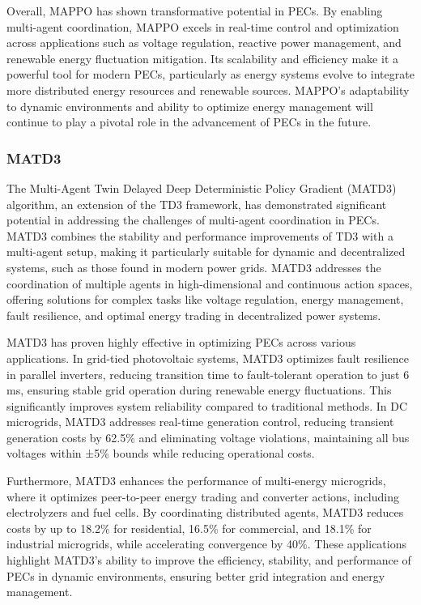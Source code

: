 Overall, MAPPO has shown transformative potential in PECs. By enabling multi-agent coordination, MAPPO excels in real-time control and optimization across applications such as voltage regulation, reactive power management, and renewable energy fluctuation mitigation. Its scalability and efficiency make it a powerful tool for modern PECs, particularly as energy systems evolve to integrate more distributed energy resources and renewable sources. MAPPO's adaptability to dynamic environments and ability to optimize energy management will continue to play a pivotal role in the advancement of PECs in the future.

\subsubsection{MATD3}

The Multi-Agent Twin Delayed Deep Deterministic Policy Gradient (MATD3) algorithm, an extension of the TD3 framework, has demonstrated significant potential in addressing the challenges of multi-agent coordination in PECs. MATD3 combines the stability and performance improvements of TD3 with a multi-agent setup, making it particularly suitable for dynamic and decentralized systems, such as those found in modern power grids. MATD3 addresses the coordination of multiple agents in high-dimensional and continuous action spaces, offering solutions for complex tasks like voltage regulation, energy management, fault resilience, and optimal energy trading in decentralized power systems.

MATD3 has proven highly effective in optimizing PECs across various applications. In grid-tied photovoltaic systems, MATD3 optimizes fault resilience in parallel inverters, reducing transition time to fault-tolerant operation to just 6 ms, ensuring stable grid operation during renewable energy fluctuations. This significantly improves system reliability compared to traditional methods. In DC microgrids, MATD3 addresses real-time generation control, reducing transient generation costs by 62.5\% and eliminating voltage violations, maintaining all bus voltages within ±5\% bounds while reducing operational costs.

Furthermore, MATD3 enhances the performance of multi-energy microgrids, where it optimizes peer-to-peer energy trading and converter actions, including electrolyzers and fuel cells. By coordinating distributed agents, MATD3 reduces costs by up to 18.2\% for residential, 16.5\% for commercial, and 18.1\% for industrial microgrids, while accelerating convergence by 40\%. These applications highlight MATD3's ability to improve the efficiency, stability, and performance of PECs in dynamic environments, ensuring better grid integration and energy management.


